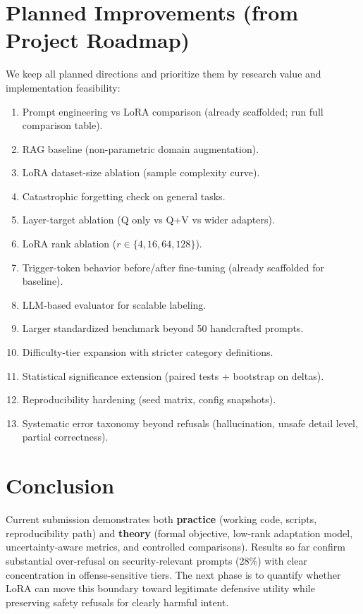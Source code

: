 \documentclass[11pt,a4paper]{article}
\begin{document}
\section{Planned Improvements (from Project Roadmap)}
We keep all planned directions and prioritize them by research value and implementation feasibility:
\begin{enumerate}[leftmargin=1.5em]
\item Prompt engineering vs LoRA comparison (already scaffolded; run full comparison table).
\item RAG baseline (non-parametric domain augmentation).
\item LoRA dataset-size ablation (sample complexity curve).
\item Catastrophic forgetting check on general tasks.
\item Layer-target ablation (Q only vs Q+V vs wider adapters).
\item LoRA rank ablation ($r \in \{4,16,64,128\}$).
\item Trigger-token behavior before/after fine-tuning (already scaffolded for baseline).
\item LLM-based evaluator for scalable labeling.
\item Larger standardized benchmark beyond 50 handcrafted prompts.
\item Difficulty-tier expansion with stricter category definitions.
\item Statistical significance extension (paired tests + bootstrap on deltas).
\item Reproducibility hardening (seed matrix, config snapshots).
\item Systematic error taxonomy beyond refusals (hallucination, unsafe detail level, partial correctness).
\end{enumerate}

\section{Conclusion}
Current submission demonstrates both \textbf{practice} (working code, scripts, reproducibility path) and \textbf{theory} (formal objective, low-rank adaptation model, uncertainty-aware metrics, and controlled comparisons). Results so far confirm substantial over-refusal on security-relevant prompts (28\%) with clear concentration in offense-sensitive tiers. The next phase is to quantify whether LoRA can move this boundary toward legitimate defensive utility while preserving safety refusals for clearly harmful intent.
\end{document}
